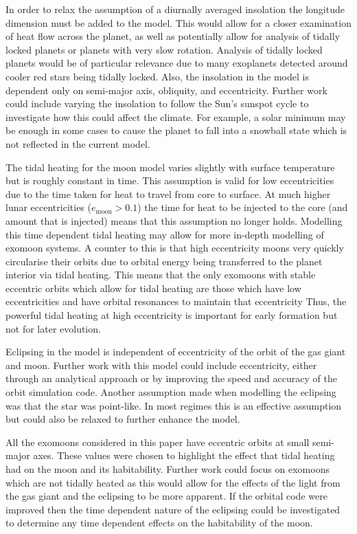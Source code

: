 \documentclass[12pt, onecolumn]{revtex4-2}    %
\begin{document}
In order to relax the assumption of a diurnally averaged insolation the longitude dimension must be added to the model.
This would allow for a closer examination of heat flow across the planet, as well as potentially allow for analysis of tidally locked planets or planets with very slow rotation.
Analysis of tidally locked planets would be of particular relevance due to many exoplanets detected around cooler red stars being tidally locked.
Also, the insolation in the model is dependent only on semi-major axis, obliquity, and eccentricity. 
Further work could include varying the insolation to follow the Sun's sunspot cycle to investigate how this could affect the climate.
For example, a solar minimum may be enough in some cases to cause the planet to fall into a snowball state which is not reflected in the current model.

The tidal heating for the moon model varies slightly with surface temperature but is roughly constant in time.
This assumption is valid for low eccentricities due to the time taken for heat to travel from core to surface.
At much higher lunar eccentricities ($e_\text{moon} > 0.1$) the time for heat to be injected to the core (and amount that is injected) means that this assumption no longer holds.
Modelling this time dependent tidal heating may allow for more in-depth modelling of exomoon systems.
A counter to this is that high eccentricity moons very quickly circularise their orbits due to orbital energy being transferred to the planet interior via tidal heating.
This means that the only exomoons with stable eccentric orbits which allow for tidal heating are those which have low eccentricities and have orbital resonances to maintain that eccentricity
Thus, the powerful tidal heating at high eccentricity is important for early formation but not for later evolution.

Eclipsing in the model is independent of eccentricity of the orbit of the gas giant and moon.
Further work with this model could include eccentricity, either through an analytical approach or by improving the speed and accuracy of the orbit simulation code.
Another assumption made when modelling the eclipsing was that the star was point-like.
In most regimes this is an effective assumption but could also be relaxed to further enhance the model.

All the exomoons considered in this paper have eccentric orbits at small semi-major axes.
These values were chosen to highlight the effect that tidal heating had on the moon and its habitability.
Further work could focus on exomoons which are not tidally heated as this would allow for the effects of the light from the gas giant and the eclipsing to be more apparent.
If the orbital code were improved then the time dependent nature of the eclipsing could be investigated to determine any time dependent effects on the habitability of the moon.
\end{document}

